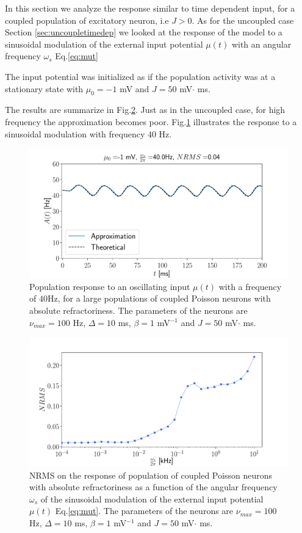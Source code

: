 \documentclass[12pt,twoside]{report}
\begin{document}
In this section we analyze the response similar to time dependent input, for a coupled population of excitatory neuron, i.e $J>0$. As for the uncoupled case Section \ref{sec:uncoupletimedep} we looked at the response of the model to a sinusoidal modulation of the external input potential $\mu(t)$ with an angular frequency $\omega_s$  Eq.\eqref{eq:mut}

The input potential was initialized as if the population activity was at a stationary state with $\mu_0=-1$ mV and $J=50$ mV$\cdot$ ms.

The results are summarize in Fig.\ref{fig:NRMSo_coupled}. Just as in the uncoupled case, for high frequency the approximation becomes poor. Fig.\ref{fig:A_omega_t_coupled} illustrates the response to a sinusoidal modulation with frequency $40$ Hz.


\begin{figure}[h!]
	\centering
	\includegraphics[width=0.8\linewidth]{A_omega_t_coupled.pdf}
	\caption{Population response to an oscillating input $\mu(t)$ with a frequency of $40$Hz, for a large populations of coupled Poisson neurons with absolute refractoriness. The parameters of the neurons are $\nu_{max}=100$ Hz, $\Delta=10$ ms, $\beta=1$ mV$^{-1}$ and  $J=50$ mV$\cdot$ ms.
	}
	\label{fig:A_omega_t_coupled}
\end{figure}


\begin{figure}[h!]
	\centering
	\includegraphics[width=0.8\linewidth]{NRMSo_coupled.pdf}
	\caption{NRMS on the response of population of coupled Poisson neurons with absolute refractoriness as a function of the angular frequency $\omega_s$  of the sinusoidal modulation of the external input potential $\mu(t)$ Eq.\eqref{eq:mut}. The parameters of the neurons are $\nu_{max}=100$ Hz, $\Delta=10$ ms, $\beta=1$ mV$^{-1}$ and  $J=50$ mV$\cdot$ ms.
	}
	\label{fig:NRMSo_coupled}
\end{figure}
\end{document}
